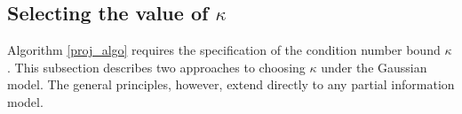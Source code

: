 \documentclass[11pt]{article}
\DeclareMathOperator*{\argmax}{arg\,max}
\theoremstyle{definition}
\theoremstyle{definition}
\def\bSigma{{\bf \Sigma}}
\def\Z{{\bf Z}}
\def\SS{{\bf S}}
\begin{document}
\subsection{Selecting the value of $\kappa$}
\label{condSelection}
Algorithm \ref{proj_algo} requires the specification of the condition number bound $\kappa$. This subsection describes two approaches to choosing $\kappa$ under the Gaussian model. The general principles, however, extend directly to any partial information model. 
\end{document}

